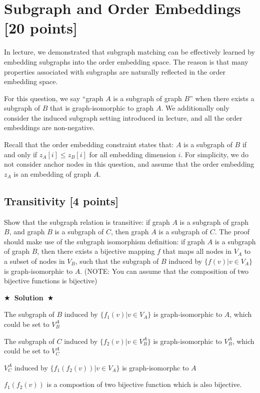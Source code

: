 \documentclass[11pt]{article}
\numberwithin{figure}{section}
\newcommand{\Solution}[1]{{\medskip \color{red} \bf $\bigstar$~\sf \textbf{Solution}~$\bigstar$ \sf #1 } \bigskip}
\begin{document}
\newpage


\section{Subgraph and Order Embeddings [20 points]}

In lecture, we demonstrated that subgraph matching can be effectively learned by embedding subgraphs into the order embedding space. The reason is that many properties associated with subgraphs are naturally reflected in the order embedding space.

For this question, we say “graph $A$ is a subgraph of graph $B$” when there exists a subgraph of $B$ that is graph-isomorphic to graph $A$. We additionally only consider the induced subgraph setting introduced in lecture, and all the order embeddings are non-negative.

Recall that the order embedding constraint states that: $A$ is a subgraph of $B$ if and only if $z_A[i] \leq z_B[i]$ for all embedding dimension $i$. For simplicity, we do not consider anchor nodes in this question, and assume that the order embedding $z_A$ is an embedding of graph $A$.

\subsection{Transitivity [4 points]}
Show that the subgraph relation is transitive: if graph $A$ is a subgraph of graph $B$, and graph $B$ is a subgraph of $C$, then graph $A$ is a subgraph of $C$. The proof should make use of the subgraph isomorphism definition: if graph $A$ is a subgraph of graph $B$, then there exists a bijective mapping $f$ that maps all nodes in $V_A$ to a subset of nodes in $V_B$, such that the subgraph of $B$ induced by $\{f(v)|v \in V_A\}$ is graph-isomorphic to $A$. (NOTE: You can assume that the composition of two bijective functions is bijective)

\Solution{}

The subgraph of $B$ induced by $\{f_{1}(v)|v \in V_A\}$ is graph-isomorphic to $A$, which could be set to $V_{B}^{A}$

The subgraph of $C$ induced by $\{f_{2}(v)|v \in V_{B}^{A}\}$ is graph-isomorphic to $V_{B}^{A}$, which could be set to $V_{C}^{A}$

$V_{C}^{A}$ induced by $\{f_{1}(f_{2}(v))|v \in V_{A}\}$ is graph-isomorphc to $A$

$f_{1}(f_{2}(v))$ is a compostion of two bijective function which is also bijective.
\end{document}
